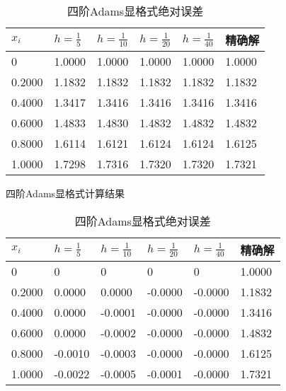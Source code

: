 \documentclass[12pt, a4paper, oneside]{ctexart}
\begin{document}

\begin{table}[h] %
    \centering
    \footnotesize
    \begin{minipage}[t]{0.48\textwidth}\centering
    \begin{tabular}{@{}llllll@{}}
        \toprule
        $x_i$      & $h=\frac{1}{5}$  & $h=\frac{1}{10}$ & $h=\frac{1}{20}$ & $h=\frac{1}{40}$ & 精确解    \\ \midrule 
        0      & 1.0000 & 1.0000 & 1.0000 & 1.0000 & 1.0000 \\
        0.2000 & 1.1832 & 1.1832 & 1.1832 & 1.1832 & 1.1832 \\
        0.4000 & 1.3417 & 1.3416 & 1.3416 & 1.3416 & 1.3416 \\
        0.6000 & 1.4833 & 1.4830 & 1.4832 & 1.4832 & 1.4832 \\
        0.8000 & 1.6114 & 1.6121 & 1.6124 & 1.6124 & 1.6125 \\
        1.0000 & 1.7298 & 1.7316 & 1.7320 & 1.7320 & 1.7321 \\ \bottomrule
        \end{tabular}
	\caption{四阶Adams显格式计算结果} \label{fig:adams11}
    \end{minipage}
    \begin{minipage}[t]{0.48\textwidth}\centering
    \begin{tabular}{@{}llllll@{}}
        \toprule
        $x_i$      & $h=\frac{1}{5}$  & $h=\frac{1}{10}$ & $h=\frac{1}{20}$ & $h=\frac{1}{40}$ & 精确解    \\ \midrule 
        0      & 0       & 0       & 0       & 0       & 1.0000 \\
        0.2000 & 0.0000  & 0.0000  & -0.0000 & -0.0000 & 1.1832 \\
        0.4000 & 0.0000  & -0.0001 & -0.0000 & -0.0000 & 1.3416 \\
        0.6000 & 0.0000  & -0.0002 & -0.0000 & -0.0000 & 1.4832 \\
        0.8000 & -0.0010 & -0.0003 & -0.0000 & -0.0000 & 1.6125 \\
        1.0000 & -0.0022 & -0.0005 & -0.0001 & -0.0000 & 1.7321 \\ \bottomrule
        \end{tabular}
	\caption{四阶Adams显格式绝对误差} \label{fig:adams12}
    \end{minipage}
\end{table}
\end{document}
